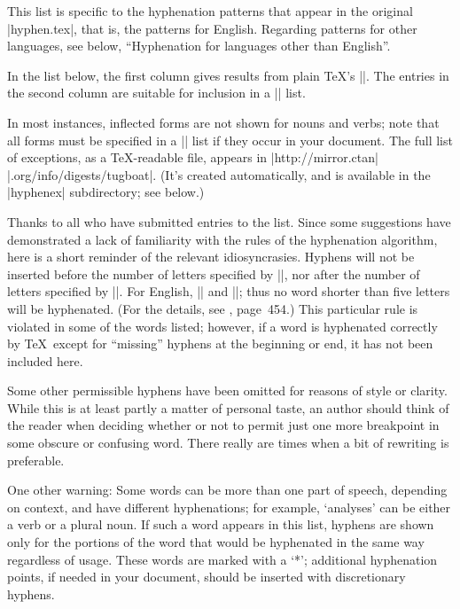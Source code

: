 This list is specific to the hyphenation patterns that appear in
the original |hyphen.tex|, that is, the patterns for  English.
Regarding patterns for other languages, see below, ``Hyphenation for
languages other than  English''.

In the list below, the first column gives results from plain \TeX's
||. The entries in the second column are suitable for
inclusion in a \hbox{||} list.

In most instances, inflected forms are not shown for nouns and verbs;
note that all forms must be specified in a || list
if they occur in your document.  The full list of exceptions, as a
\TeX-readable file, appears in
|http://mirror.ctan| |.org/info/digests/tugboat|.
(It's created automatically, and is available in the
|hyphenex| subdirectory; see below.)

Thanks to all who have submitted entries to the list.  Since some
suggestions have demonstrated a lack of familiarity with the rules of
the hyphenation algorithm, here is a short reminder of the relevant
idiosyncrasies.  Hyphens will not be inserted before the number of
letters specified by |\lefthyphenmin|, nor after the number of letters
specified by |\righthyphenmin|.  For  English, ||
and ||; thus no word shorter than five
letters will be hyphenated.  (For the details, see \TB, page~454.)
This particular rule is violated in some of the words listed; however,
if a word is hyphenated correctly by \TeX\ except for ``missing''
hyphens at the beginning or end, it has not been included here.

Some other permissible hyphens have been omitted
for reasons of style or clarity.  While this is at
least partly a matter of personal taste, an author should think of the
reader when deciding whether or not to permit just one more breakpoint
in some obscure or confusing word.  There really are times when a bit of
rewriting is preferable.
{\hfuzz=2.2pt\par}

One other warning: Some words can be more than one part of speech,
depending on context, and have different hyphenations; for example,
`analyses' can be either a verb or a plural noun.  If such a word appears
in this list, hyphens are shown only for the portions of the word that
would be hyphenated in the same way regardless of usage.  These words
are marked with a `*'; additional hyphenation points, if needed in your
document, should be inserted with discretionary hyphens.

